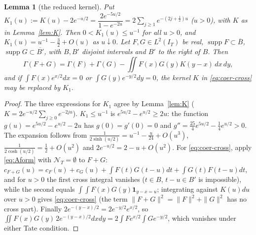 \documentclass[11pt]{amsart}
\newtheorem{lemma}[theorem]{Lemma}
\theoremstyle{definition}
\theoremstyle{remark}
\newcommand{\supp}{\operatorname{supp}}
\newcommand{\IT}{I_T}
\newcommand{\cF}{c_F}
\newcommand{\NT}{\mathcal N_T}
\begin{document}
\begin{lemma}[the reduced kernel]\label{lem:coer-K1}
Put $K_1(u):=K(u)-2e^{-u/2}=\dfrac{2e^{-5u/2}}{1-e^{-2u}}=2\sum_{j\ge1}e^{-(2j+\frac12)u}$ ($u>0$), with
$K$ as in Lemma~\ref{lem:K}. Then $0<K_1(u)\le u^{-1}$ for all $u>0$, and $K_1(u)=u^{-1}-\frac32+O(u)$ as
$u\downarrow0$. Let $F,G\in L^2(\IT)$ be real, $\supp F\subset\overline B$, $\supp G\subset\overline{B'}$,
with $B,B'$ disjoint intervals and $B'$ to the right of $B$. Then
\begin{equation}\label{eq:coer-cross}
\Gamma(F+G)=\Gamma(F)+\Gamma(G)-\iint F(x)G(y)K(y-x)\,dx\,dy ,
\end{equation}
and if $\int F(x)e^{x/2}dx=0$ or $\int G(y)e^{-y/2}dy=0$, the kernel $K$ in \eqref{eq:coer-cross} may be
replaced by $K_1$.
\end{lemma}
\begin{proof}
The three expressions for $K_1$ agree by Lemma~\ref{lem:K} ($K=2e^{-u/2}\sum_{j\ge0}e^{-2ju}$).
$K_1\le u^{-1}$ is $e^{5u/2}-e^{u/2}\ge2u$: the function $g(u)=e^{5u/2}-e^{u/2}-2u$ has $g(0)=g'(0)=0$ and
$g''=\frac{25}4e^{5u/2}-\frac14e^{u/2}>0$. The expansion follows from
$\frac1{2\sinh(u/2)}=u^{-1}-\frac u{24}+O(u^3)$, $\frac1{2\cosh(u/2)}=\frac12+O(u^2)$ and
$2e^{-u/2}=2-u+O(u^2)$. For \eqref{eq:coer-cross}, apply \eqref{eq:Aform} with $\NT=\emptyset$ to
$F+G$: $c_{F+G}(u)=\cF(u)+c_G(u)+\int F(t)G(t-u)dt+\int G(t)F(t-u)dt$, and for $u>0$ the first cross
integral vanishes ($t\in B$, $t-u\in B'$ is impossible), while the second equals
$\int\!\!\int F(x)G(y)\mathbf 1_{y-x=u}$; integrating against $K(u)du$ over $u>0$ gives
\eqref{eq:coer-cross} (the term $\|F+G\|^2=\|F\|^2+\|G\|^2$ has no cross part). Finally
$2e^{-(y-x)/2}=2e^{-y/2}e^{x/2}$, so $\iint F(x)G(y)\,2e^{-(y-x)/2}dxdy=2\int Fe^{x/2}\int Ge^{-y/2}$,
which vanishes under either Tate condition.
\end{proof}
\end{document}
